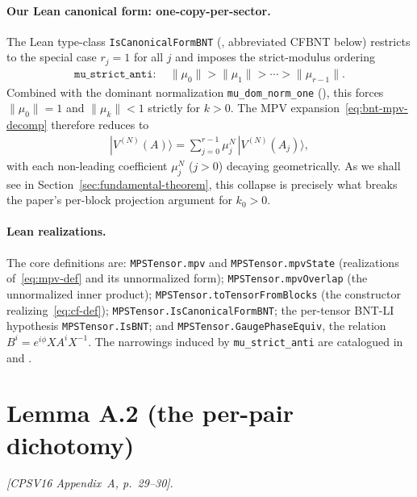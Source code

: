 \documentclass{article}
\newcommand{\leanid}[1]{\texttt{#1}}
\newcommand{\paperref}[1]{\textit{[CPSV16 #1]}}
\theoremstyle{plain}
\begin{document}
\paragraph{Our Lean canonical form: one-copy-per-sector.}
The Lean type-class \leanid{IsCanonicalFormBNT}
(, abbreviated CFBNT below)
restricts to the special case $r_j = 1$ for all $j$ and imposes the
strict-modulus ordering
\begin{align}
    \leanid{mu\_strict\_anti}: \quad
    \|\mu_0\| > \|\mu_1\| > \cdots > \|\mu_{r-1}\|.
\end{align}
Combined with the dominant normalization \leanid{mu\_dom\_norm\_one}
(), this forces $\|\mu_0\|
    = 1$ and $\|\mu_k\| < 1$ strictly for $k > 0$. The MPV
expansion~\eqref{eq:bnt-mpv-decomp} therefore reduces to
\begin{align}
    |V^{(N)}(A)\rangle = \sum_{j=0}^{r-1} \mu_j^N\, |V^{(N)}(A_j)\rangle,
    \label{eq:bnt-mpv-decomp-restricted}
\end{align}
with each non-leading coefficient $\mu_j^N$ ($j > 0$) decaying
geometrically. As we shall see in Section~\ref{sec:fundamental-theorem},
this collapse is precisely what breaks the paper's per-block projection
argument for $k_0 > 0$.

\paragraph{Lean realizations.}
The core definitions are: \leanid{MPSTensor.mpv} and
\leanid{MPSTensor.mpvState} (realizations of~\eqref{eq:mpv-def} and its
unnormalized form); \leanid{MPSTensor.mpvOverlap} (the unnormalized inner
product); \leanid{MPSTensor.toTensorFromBlocks} (the constructor
realizing~\eqref{eq:cf-def}); \leanid{MPSTensor.IsCanonicalFormBNT}; the
per-tensor BNT-LI hypothesis \leanid{MPSTensor.IsBNT}; and
\leanid{MPSTensor.GaugePhaseEquiv}, the relation $B^i = e^{i\phi} X A^i
    X^{-1}$. The narrowings induced by \leanid{mu\_strict\_anti} are
catalogued in
 and
.

\section{Lemma A.2 (the per-pair dichotomy)}
\label{sec:lemma-A2}

\paperref{Appendix~A, p.~29--30}.
\end{document}
